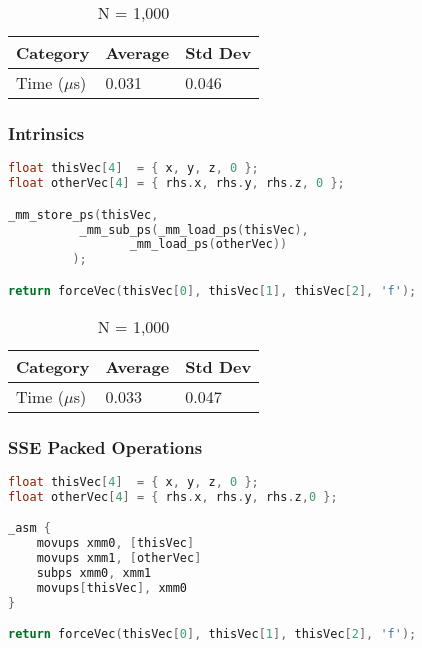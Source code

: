 \documentclass{article}
\begin{document}
\vspace{3mm}

\begin{table}[ht!]
\centering
\begin{tabular}{l|l|l}
Category        &   Average &   Std Dev \\
\hline
Time ($\mu$s)    &   0.031   &   0.046   \\
\end{tabular}
\caption{N = 1,000}
\end{table}

\vspace{5mm}

\subsubsection{Intrinsics}

\begin{lstlisting}[language=C++]
float thisVec[4]  = { x, y, z, 0 };
float otherVec[4] = { rhs.x, rhs.y, rhs.z, 0 };

_mm_store_ps(thisVec, 
		  _mm_sub_ps(_mm_load_ps(thisVec),
 		 		 _mm_load_ps(otherVec))
		 );

return forceVec(thisVec[0], thisVec[1], thisVec[2], 'f');
\end{lstlisting}

\vspace{3mm}

\begin{table}[ht!]
\centering
\begin{tabular}{l|l|l}
Category        &   Average &   Std Dev \\
\hline
Time ($\mu$s)    &   0.033   &   0.047   \\
\end{tabular}
\caption{N = 1,000}
\end{table}

\vspace{5mm}

\subsubsection{SSE Packed Operations}

\begin{lstlisting}[language=C++]
float thisVec[4]  = { x, y, z, 0 };
float otherVec[4] = { rhs.x, rhs.y, rhs.z,0 };

_asm {
	movups xmm0, [thisVec]
	movups xmm1, [otherVec]
	subps xmm0, xmm1
	movups[thisVec], xmm0
}

return forceVec(thisVec[0], thisVec[1], thisVec[2], 'f');
\end{lstlisting}
\end{document}

